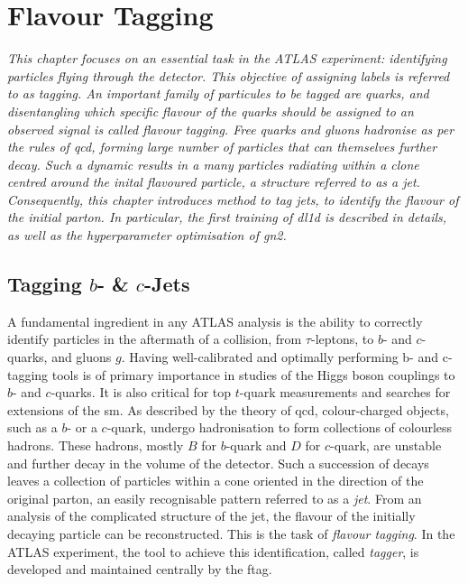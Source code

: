 \chapter{\color{oxfordblue} Flavour Tagging}
\ChapFrame

\textit{
This chapter focuses on an essential task in the ATLAS experiment: identifying particles flying through the detector. This objective of assigning labels is referred to as tagging. An important family of particules to be tagged are quarks, and disentangling which specific flavour of the quarks should be assigned to an observed signal is called flavour tagging. Free quarks and gluons hadronise as per the rules of \gls{qcd}, forming large number of particles that can themselves further decay. Such a dynamic results in a many particles radiating within a clone centred around the inital flavoured particle, a structure referred to as a jet. Consequently, this chapter introduces method to tag jets, to identify the flavour of the initial parton. In particular, the first training of \gls{dl1d} is described in details, as well as the hyperparameter optimisation of \gls{gn2}.
}

\section{Tagging $b$- \& $c$-Jets}
A fundamental ingredient in any ATLAS analysis is the ability to correctly identify particles in the aftermath of a collision, from $\tau$-leptons, to $b$- and $c$-quarks, and gluons $g$. Having well-calibrated and optimally performing b- and c-tagging tools is of primary importance in studies of the Higgs boson couplings to $b$- and $c$-quarks. It is also critical for top $t$-quark measurements and searches for extensions of the \gls{sm}. As described by the theory of \gls{qcd}, colour-charged objects, such as a $b$- or a $c$-quark, undergo hadronisation to form collections of colourless hadrons. These hadrons, mostly $B$ for $b$-quark and $D$ for $c$-quark, are unstable and further decay in the volume of the detector. Such a succession of decays leaves a collection of particles within a cone oriented in the direction of the original parton, an easily recognisable pattern referred to as a \textit{jet}. From an analysis of the complicated structure of the jet, the flavour of the initially decaying particle can be reconstructed. This is the task of \textit{flavour tagging}. In the ATLAS experiment, the tool to achieve this identification, called \textit{tagger}, is developed and maintained centrally by the \gls{ftag}. \\

